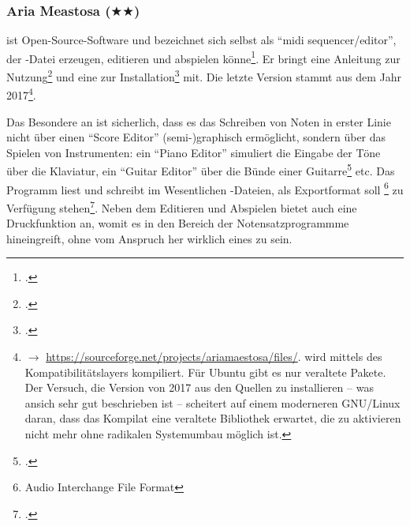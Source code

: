 %
%
%



\subsubsection{Aria Meastosa ($\bigstar$$\bigstar$)}

\label{AriaMaestosa} ist Open-Source-Software und bezeichnet
sich selbst als  \enquote{midi sequencer/editor}, der -Datei erzeugen,
editieren und abspielen könne\footcite[vgl.][\nopage wp]{AriaMaestosa2017a}. Er
bringt eine Anleitung zur Nutzung\footcite[vgl.][\nopage wp]{AriaMaestosa2017b}
und eine zur Installation\footcite[vgl.][\nopage wp]{AriaMaestosa2017c} mit. Die
letzte Version stammt aus dem Jahr 2017\footnote{$\rightarrow$
\href{https://sourceforge.net/projects/ariamaestosa/files/}
{https://sourceforge.net/projects/ariamaestosa/files/}.  wird
mittels des Kompatibilitätslayers  kompiliert. Für Ubuntu gibt es
nur veraltete Pakete. Der Versuch, die Version von 2017 aus den Quellen zu
installieren -- was ansich sehr gut beschrieben ist -- scheitert auf einem
mo\-der\-ne\-ren GNU/Linux daran, dass das Kompilat eine veraltete Bibliothek
erwartet, die zu aktivieren nicht mehr ohne radikalen Systemumbau möglich ist.}.

Das Besondere an  ist sicherlich, dass es das Schreiben von
Noten in erster Linie nicht über einen \enquote{Score Editor} (semi-)graphisch
ermöglicht, sondern über das Spielen von Instrumenten: ein \enquote{Piano Editor}
simuliert die Eingabe der Töne über die Klaviatur, ein \enquote{Guitar
Editor} über die Bünde einer Guitarre\footcite[vgl.][\nopage
wp]{AriaMaestosa2017b} etc. Das Programm liest und schreibt im Wesentlichen
-Dateien, als Exportformat soll \footnote{Audio Interchange
File Format} zu Verfügung stehen\footcite[vgl.][\nopage wp]{Guepewi2017a}. Neben
dem Editieren und Abspielen bietet  auch eine
Druckfunktion an, womit es in den Bereich der Notensatzprogrammme hineingreift,
ohne vom Anspruch her wirklich eines zu sein.

